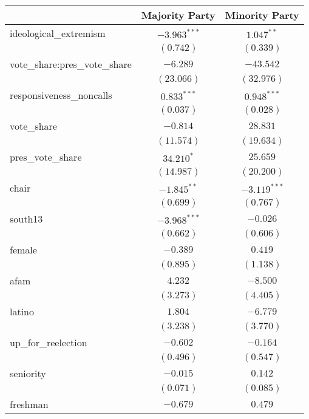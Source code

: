 \documentclass[12pt]{article}
\begin{document}
\begin{table}
	\begin{center}
		\begin{tabular}{l c c }
			\hline
			& Majority Party & Minority Party \\
			\hline
			ideological\_extremism        & $-3.963^{***}$ & $1.047^{**}$   \\
			& $(0.742)$      & $(0.339)$      \\
			vote\_share:pres\_vote\_share & $-6.289$       & $-43.542$      \\
			& $(23.066)$     & $(32.976)$     \\
			responsiveness\_noncalls      & $0.833^{***}$  & $0.948^{***}$  \\
			& $(0.037)$      & $(0.028)$      \\
			vote\_share                   & $-0.814$       & $28.831$       \\
			& $(11.574)$     & $(19.634)$     \\
			pres\_vote\_share             & $34.210^{*}$   & $25.659$       \\
			& $(14.987)$     & $(20.200)$     \\
			chair                         & $-1.845^{**}$  & $-3.119^{***}$ \\
			& $(0.699)$      & $(0.767)$      \\
			south13                       & $-3.968^{***}$ & $-0.026$       \\
			& $(0.662)$      & $(0.606)$      \\
			female                        & $-0.389$       & $0.419$        \\
			& $(0.895)$      & $(1.138)$      \\
			afam                          & $4.232$        & $-8.500$       \\
			& $(3.273)$      & $(4.405)$      \\
			latino                        & $1.804$        & $-6.779$       \\
			& $(3.238)$      & $(3.770)$      \\
			up\_for\_reelection           & $-0.602$       & $-0.164$       \\
			& $(0.496)$      & $(0.547)$      \\
			seniority                     & $-0.015$       & $0.142$        \\
			& $(0.071)$      & $(0.085)$      \\
			freshman                      & $-0.679$       & $0.479$        \\

\end{tabular}
\end{center}
\end{table}
\end{document}

